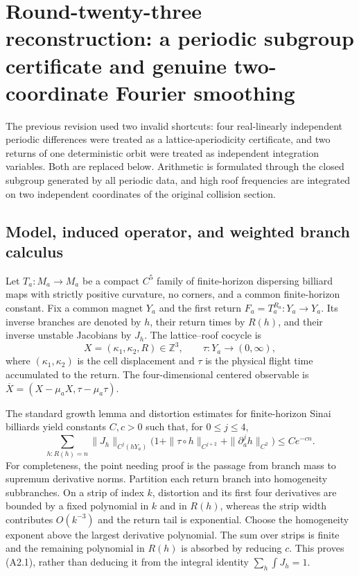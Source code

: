 \section{Round-twenty-three reconstruction: a periodic subgroup certificate and genuine two-coordinate Fourier smoothing}
\label{sec:r23-a2}

The previous revision used two invalid shortcuts: four real-linearly independent
periodic differences were treated as a lattice-aperiodicity certificate, and
two returns of one deterministic orbit were treated as independent integration
variables.  Both are replaced below.  Arithmetic is formulated through the
closed subgroup generated by all periodic data, and high roof frequencies are
integrated on two independent coordinates of the original collision section.

\subsection{Model, induced operator, and weighted branch calculus}

Let $T_a:M_a\to M_a$ be a compact $C^5$ family of finite-horizon dispersing
billiard maps with strictly positive curvature, no corners, and a common
finite-horizon constant.  Fix a common magnet $Y_a$ and the first return
$F_a=T_a^{R_a}:Y_a\to Y_a$.  Its inverse branches are denoted by $h$, their
return times by $R(h)$, and their inverse unstable Jacobians by $J_h$.  The
lattice--roof cocycle is
\[
 X=(\kappa_1,\kappa_2,R)\in\mathbb Z^3,
 \qquad \tau:Y_a\to(0,\infty),
\]
where $(\kappa_1,\kappa_2)$ is the cell displacement and $\tau$ is the physical
flight time accumulated to the return.  The four-dimensional centered
observable is $\overline X=(X-\mu_aX,\tau-\mu_a\tau)$.

The standard growth lemma and distortion estimates for finite-horizon Sinai
billiards \cite{ChernovMarkarian2006,DemersZhang2016} yield constants
$C,c>0$ such that, for $0\le j\le4$,
\[
 \sum_{h:R(h)=n}
 \|J_h\|_{C^j(hY_a)}
 \bigl(1+\|\tau\circ h\|_{C^{j+2}}+
          \|\partial_a^j h\|_{C^2}\bigr)
 \le Ce^{-cn}.                                      \tag{A2.1}
\]
For completeness, the point needing proof is the passage from branch mass to
supremum derivative norms.  Partition each return branch into homogeneity
subbranches.  On a strip of index $k$, distortion and its first four
derivatives are bounded by a fixed polynomial in $k$ and in $R(h)$, whereas
the strip width contributes $O(k^{-3})$ and the return tail is exponential.
Choose the homogeneity exponent above the largest derivative polynomial.  The
sum over strips is finite and the remaining polynomial in $R(h)$ is absorbed
by reducing $c$.  This proves (A2.1), rather than deducing it from the integral
identity $\sum_h\int J_h=1$.

